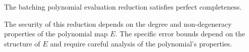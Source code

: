 \begin{theorem}
    The batching polynomial evaluation reduction satisfies perfect completeness.
\end{theorem}

\begin{remark}
    The security of this reduction depends on the degree and non-degeneracy properties of the polynomial map $E$. The specific error bounds depend on the structure of $E$ and require careful analysis of the polynomial's properties.
\end{remark}
